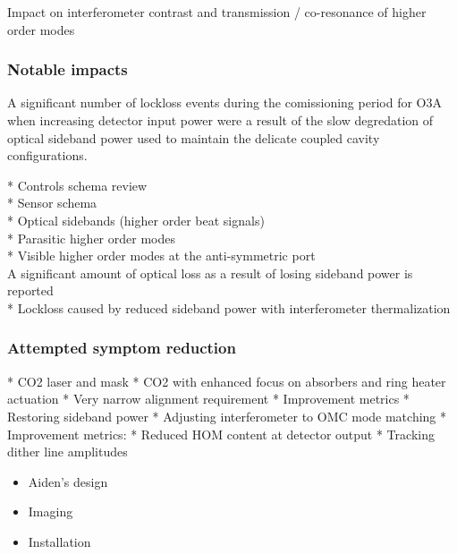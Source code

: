 Impact on interferometer contrast and transmission / co-resonance of higher order modes

\subsubsection{Notable impacts}
A significant number of lockloss events during the comissioning period for O3A when increasing detector input power were a result of the slow degredation of optical sideband power used to maintain the delicate coupled cavity configurations.


	* Controls schema review \\
		* Sensor schema \\
		* Optical sidebands (higher order beat signals) \\
	* Parasitic higher order modes \\
		* Visible higher order modes at the anti-symmetric port \\
A significant amount of optical loss as a result of losing sideband power is reported \\
	* Lockloss caused by reduced sideband power with interferometer thermalization \\

\subsubsection{Attempted symptom reduction}
	* CO2 laser and mask
		* CO2 with enhanced focus on absorbers and ring heater actuation
		* Very narrow alignment requirement
		* Improvement metrics
			* Restoring sideband power	
	* Adjusting interferometer to OMC mode matching
		* Improvement metrics:
			* Reduced HOM content at detector output
			* Tracking dither line amplitudes

\begin{itemize}
\item Aiden's design
\item Imaging
\item Installation

\end{itemize}

